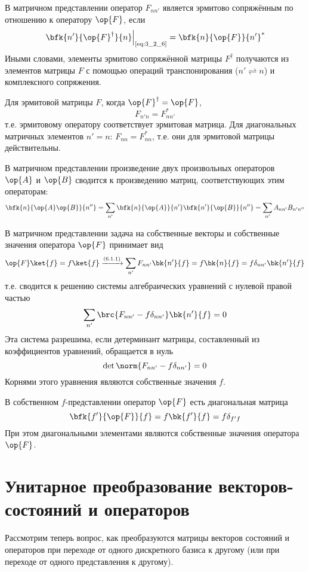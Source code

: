В матричном представлении оператор $F_{nn'}$ является эрмитово сопряжённым по отношению к оператору $\op{F}$, если
$$
\left .\bfk{n'}{\op{F}^\dag}{n}\right|_{\text{\eqref{eq:3_2_6}}} = \bfk{n}{\op{F}}{n'}^*
$$%
%
Иными словами, элементы эрмитово сопряжённой матрицы $F^\dag$ получаются из элементов матрицы $F$ с помощью операций транспонирования ($n' \rightleftharpoons n $) и комплексного сопряжения.

Для эрмитовой матрицы $F$, когда $\op{F}^\dag = \op{F}$,
$$
F_{n'n}=F_{nn'}^*
$$%
%
т.е. эрмитовому оператору соответствует эрмитовая матрица. Для диагональных матричных элементов $n' = n$: $F_{nn} = F^*_{nn}$, т.е. они для эрмитовой матрицы действительны.

В матричном представлении произведение двух произвольных операторов $\op{A}$ и $\op{B}$ сводится к произведению матриц, соответствующих этим операторам:%
$$
\bfk{n}{\op{A}\op{B}}{n''} =
	\sum_{n'} \bfk{n}{\op{A}}{n'} \bfk{n'}{\op{B}}{n''} =
	\sum_{n'} A_{nn'} B_{n'n''}
$$

В матричном представлении задача на собственные векторы и собственные значения оператора $\op{F}$ принимает вид%
$$
\op{F}\ket{f}=f\ket{f} \xrightarrow{(6.1.1)} \sum_{n'} F_{nn'} \bk{n'}{f} = f\bk{n}{f}=f\delta_{nn'}\bk{n'}{f}
$$%
%
т.е. сводится к решению системы алгебраических уравнений с нулевой правой частью%
%
$$
\sum_{n'}\brc{F_{nn'}-f\delta_{nn'}}\bk{n'}{f}=0
$$%
%
Эта система разрешима, если детерминант матрицы, составленный из коэффициентов уравнений, обращается в нуль%
%
$$
\det{\norm{F_{nn'}-f\delta_{nn'}}}=0
$$%
%
Корнями этого уравнения являются собственные значения $f$.

В собственном $f$-представлении оператор $\op{F}$ есть диагональная матрица%
%
$$
\bfk{f'}{\op{F}}{f}=f\bk{f'}{f}=f\delta_{f'f}
$$%
%
При этом диагональными элементами являются собственные значения оператора $\op{F}$.


\section{Унитарное преобразование векторов-состояний и операторов}

Рассмотрим теперь вопрос, как преобразуются матрицы векторов состояний и операторов при переходе от одного дискретного базиса к другому (или при переходе от одного представления к другому).

